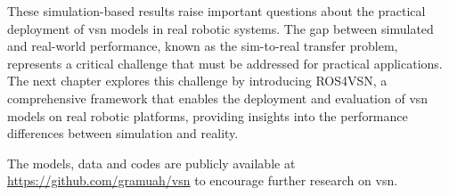 These simulation-based results raise important questions about the practical deployment of \acrshort{vsn} models in real robotic systems.
The gap between simulated and real-world performance, known as the sim-to-real transfer problem, represents a critical challenge that must be addressed for practical applications.
The next chapter explores this challenge by introducing ROS4VSN, a comprehensive framework that enables the deployment and evaluation of \acrshort{vsn} models on real robotic platforms, providing insights into the performance differences between simulation and reality.

The models, data and codes are publicly available at \url{https://github.com/gramuah/vsn} to encourage further research on \acrshort{vsn}\@.